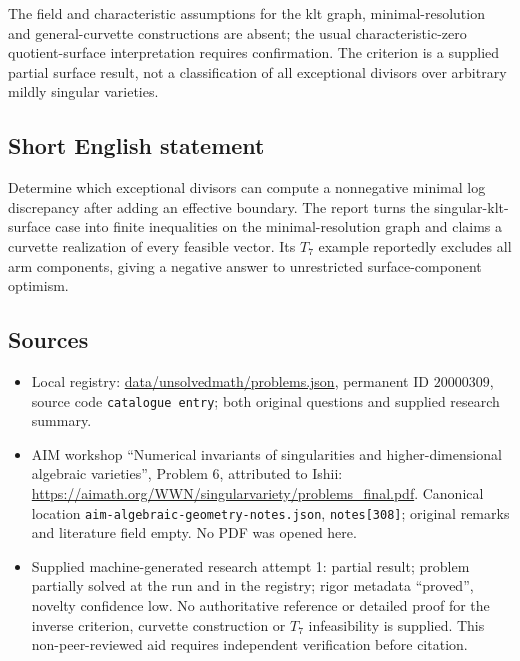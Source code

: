 \documentclass[11pt]{article}
\begin{document}
The field and characteristic assumptions for the klt graph, minimal-resolution and general-curvette constructions are absent; the usual characteristic-zero quotient-surface interpretation requires confirmation. The criterion is a supplied partial surface result, not a classification of all exceptional divisors over arbitrary mildly singular varieties.
\subsection{Short English statement}
Determine which exceptional divisors can compute a nonnegative minimal log discrepancy after adding an effective boundary. The report turns the singular-klt-surface case into finite inequalities on the minimal-resolution graph and claims a curvette realization of every feasible vector. Its $T_7$ example reportedly excludes all arm components, giving a negative answer to unrestricted surface-component optimism.
\subsection{Sources}
\begin{itemize}
\item Local registry: \url{data/unsolvedmath/problems.json}, permanent ID $20000309$, source code \texttt{catalogue entry}; both original questions and supplied research summary.
\item AIM workshop ``Numerical invariants of singularities and higher-dimensional algebraic varieties'', Problem 6, attributed to Ishii: \url{https://aimath.org/WWN/singularvariety/problems_final.pdf}. Canonical location \texttt{aim-algebraic-geometry-notes.json}, \texttt{notes[308]}; original remarks and literature field empty. No PDF was opened here.
\item Supplied machine-generated research attempt 1: partial result; problem partially solved at the run and in the registry; rigor metadata ``proved'', novelty confidence low. No authoritative reference or detailed proof for the inverse criterion, curvette construction or $T_7$ infeasibility is supplied. This non-peer-reviewed aid requires independent verification before citation.
\end{itemize}
\end{document}
